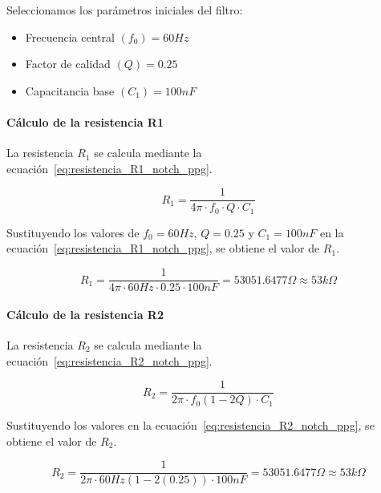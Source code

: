         Seleccionamos los parámetros iniciales del filtro:
        \begin{itemize}
            \item Frecuencia central $(f_0) = 60 Hz$
            \item Factor de calidad $(Q) = 0.25$
            \item Capacitancia base $(C_1) = 100 nF$
        \end{itemize}

        \paragraph{Cálculo de la resistencia R1}
        La resistencia $R_1$ se calcula mediante la ecuación~\ref{eq:resistencia_R1_notch_ppg}.

        \begin{equation}
            \label{eq:resistencia_R1_notch_ppg}
            R_1 = \frac{1}{4\pi \cdot f_0 \cdot Q \cdot C_1}
        \end{equation}

        Sustituyendo los valores de $f_0 = 60 Hz$, $Q = 0.25$ y $C_1 = 100 nF$ en la ecuación~\ref{eq:resistencia_R1_notch_ppg}, se obtiene el valor de $R_1$.

        \begin{equation}
            R_1 = \frac{1}{4\pi \cdot 60 Hz \cdot 0.25 \cdot 100 nF} = 53051.6477 \Omega \approx 53 k\Omega
        \end{equation}

        \paragraph{Cálculo de la resistencia R2}
        La resistencia $R_2$ se calcula mediante la ecuación~\ref{eq:resistencia_R2_notch_ppg}.

        \begin{equation}
            \label{eq:resistencia_R2_notch_ppg}
            R_2 = \frac{1}{2\pi \cdot f_0 (1 - 2Q) \cdot C_1}
        \end{equation}

        Sustituyendo los valores en la ecuación~\ref{eq:resistencia_R2_notch_ppg}, se obtiene el valor de $R_2$.

        \begin{equation}
            R_2 = \frac{1}{2\pi \cdot 60 Hz(1 - 2(0.25)) \cdot 100 nF} = 53051.6477 \Omega \approx 53 k\Omega
        \end{equation}

